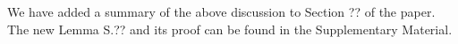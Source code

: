 \documentclass[a4paper,12pt]{article}
\begin{document}
\begin{enumerate}[label=(\arabic*),leftmargin=0.7cm]
We have added a summary of the above discussion to Section ?? of the paper. The new Lemma S.?? and its proof can be found in the Supplementary Material.









\end{enumerate}
\end{document}
